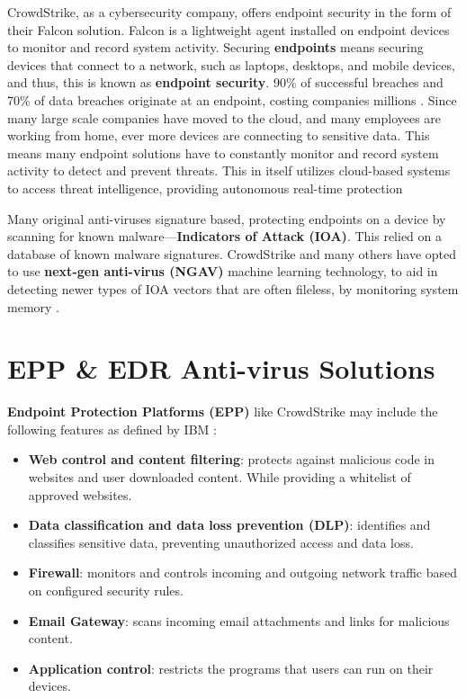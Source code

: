 CrowdStrike, as a cybersecurity company, offers endpoint security in the form of their Falcon solution. Falcon is a lightweight agent installed on endpoint devices to monitor and record system activity.
Securing \textbf{endpoints} means securing devices that connect to a network, such as laptops, desktops, and mobile devices, and thus, this is known as \textbf{endpoint security}.
90\% of successful breaches and 70\% of data breaches originate at an endpoint, costing companies millions \cite{ibm_endpoint_security}. 
Since many large scale companies have moved to the cloud, and many employees are working from home, ever more devices are connecting to sensitive data. This means many endpoint solutions 
have to constantly monitor and record system activity to detect and prevent threats. This in itself utilizes cloud-based systems to access threat intelligence, providing autonomous 
real-time protection \cite{cisco_endpoint_security}

Many original anti-viruses signature based, protecting endpoints on a device by scanning for known malware---\textbf{Indicators of Attack (IOA)}. 
This relied on a database of known malware signatures. CrowdStrike and many others
have opted to use \textbf{next-gen anti-virus (NGAV)} machine learning technology,
to aid in detecting newer types of IOA vectors that are often fileless, by monitoring system memory  \cite{ionescu_kernel_access_2024}.

\newpage

\section{EPP \& EDR Anti-virus Solutions}
\textbf{Endpoint Protection Platforms (EPP)} like CrowdStrike may include the following features as defined by IBM \cite{ibm_endpoint_security}:
\begin{itemize}
    \item \textbf{Web control and content filtering}: protects against malicious code in websites and 
    user downloaded content. While providing a whitelist of approved websites.
    \item \textbf{Data classification and data loss prevention (DLP)}: identifies and classifies sensitive data, 
    preventing unauthorized access and data loss.
    \item \textbf{Firewall}: monitors and controls incoming and outgoing network traffic based on configured security rules.
    \item \textbf{Email Gateway}: scans incoming email attachments and links for malicious content.
    \item \textbf{Application control}: restricts the programs that users can run on their devices.
\end{itemize}

